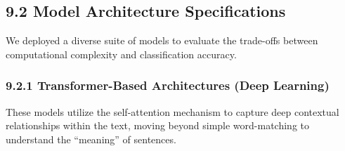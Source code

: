 \documentclass[
]{article}
\begin{document}
\subsection{9.2 Model Architecture
Specifications}\label{model-architecture-specifications}

We deployed a diverse suite of models to evaluate the trade-offs between
computational complexity and classification accuracy.

\subsubsection{9.2.1 Transformer-Based Architectures (Deep
Learning)}\label{transformer-based-architectures-deep-learning}

These models utilize the self-attention mechanism to capture deep
contextual relationships within the text, moving beyond simple
word-matching to understand the ``meaning'' of sentences.
\end{document}
